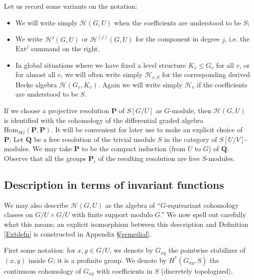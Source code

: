 \documentclass[10pt]{amsart}
\newcommand{\Ext}{\mathrm{Ext}}
\newcommand{\Hom}{\mathrm{Hom}}
\theoremstyle{remark}
\begin{document}
 
 Let us record some variants on the notation:
 \begin{itemize}
 \item[-] We will write simply $\mathscr{H}(G, U)$ when the coefficients are understood to be $S$;  
\item[-] We write $\mathscr{H}^{j}(G, U)$ or $\mathscr{H}^{(j)}(G, U)$ for the component in degree $j$,  i.e.  the $\Ext^j$ summand on the right.  
\item[-]  In  global situations where we have  fixed a level structure $K_v \leqslant G_v$ for all $v$, or for almost all $v$, 
we will often write simply $\mathscr{H}_{v,S}$  for the corresponding derived Hecke algebra $\mathscr{H}(G_v, K_v)$.  Again we will write simply $\mathscr{H}_v$
if the coefficients are understood to be $S$. 
\end{itemize} 
 
If we choose a projective resolution $\mathbf{P}$ of $S[G/U]$
as $G$-module,  then $\mathscr{H}(G, U)$ is identified with
the  cohomology of the differential graded algebra
$\Hom_{SG}(\mathbf{P}, \mathbf{P})$.  
It will be convenient for later use to  make an explicit choice of $\mathbf{P}$:  
Let $\mathbf{Q}$ be a free resolution of the trivial module $S$ in 
the category of $S [U/V]$-modules. We may take $\mathbf{P}$ to be  
  the compact induction  (from $U$ to $G$) of $\mathbf{Q}$. Observe that all the groups $\mathbf{P}_i$
of the resulting resolution are free $S$-modules.  
              



 

\subsection{Description in terms of invariant functions}  \label{desc2} 
We may also describe $\mathscr{H}(G, U)$ as the algebra of
``$G$-equivariant cohomology classes on $G/U \times G/U$ with finite support modulo $G$.'' 
We now spell out carefully what this means; 
an explicit isomorphism
between this description and Definition \ref{Extdefn} is constructed in Appendix \S \ref{remedial}. 

First some notation: for $x,y \in G/U$, 
we denote by $G_{xy}$  the pointwise stabilizer of $(x,y)$ inside $G$; it is a profinite group.
We denote by $H^*(G_{xy}, S)$  the continuous cohomology of $G_{xy}$ with coefficients in $S$ (discretely topologized).
 
\end{document}
